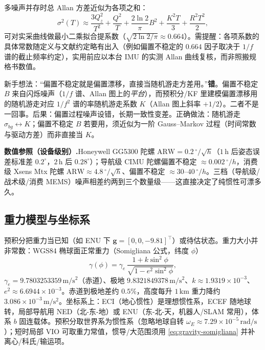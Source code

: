 多噪声并存时总 Allan 方差近似为各项之和：
\begin{equation}
  \sigma^2(T)\approx\frac{3Q_z^2}{T^2}+\frac{Q^2}{T}+\frac{2\ln2}{\pi}B^2+\frac{K^2T}{3}+\frac{R^2T^2}{2},
  \label{eq:allan-combined}
\end{equation}
可对实采曲线做最小二乘拟合提系数（$\sqrt{2\ln2/\pi}\approx0.664$）。需提醒：各项系数的具体常数随定义与文献约定略有出入（例如偏置不稳定的 $0.664$ 因子取决于 $1/f$ 谱的截止频率约定），实用前应以本台 IMU 的实测 Allan 曲线复核，而非照搬规格书数值。

\begin{pitfall}
新手想法：“偏置不稳定就是偏置漂移，直接当随机游走方差用。”\textbf{错}。偏置不稳定 $B$ 来自闪烁噪声（$1/f$ 谱、Allan 图上的\emph{平台}），而预积分/KF 里建模偏置漂移用的随机游走对应 $1/f^2$ 谱的率随机游走系数 $K$（Allan 图上斜率 $+1/2$）。二者不是一回事。后果：偏置过程噪声设错，长期一致性变差。正确做法：随机游走 $\sigma_{bg}\leftrightarrow K$；偏置不稳定 $B$ 若要用，须近似为一阶 Gauss--Markov 过程（时间常数与驱动方差）而非直接当 $K$。
\end{pitfall}

\begin{note}
\textbf{数值参照（设备级别）.}\;Honeywell GG5300 陀螺 $\mathrm{ARW}=0.2\,^\circ/\sqrt h$（$1\,\mathrm h$ 后姿态误差标准差 $0.2^\circ$，$2\,\mathrm h$ 后 $0.28^\circ$）\cite{woodman2007inertial}；导航级 CIMU 陀螺偏置不稳定 $\approx0.002\,^\circ/h$，消费级 Xsens Mtx 陀螺 $\mathrm{ARW}\approx4.8\,^\circ/\sqrt h$、偏置不稳定 $\approx30$--$40\,^\circ/h$。三档（导航级/战术级/消费 MEMS）噪声相差约两到三个数量级——这直接决定了纯惯性可漂多久。
\end{note}

\subsection{重力模型与坐标系}
\label{subsec:gravity}

预积分把重力当已知（如 ENU 下 $\mathbf g=[0,0,-9.81]^\top$）或待估状态。重力大小并非常数：WGS84 椭球面正常重力（Somigliana 公式，纬度 $\phi$）
\begin{equation}
  \gamma(\phi)=\gamma_e\,\frac{1+k\sin^2\phi}{\sqrt{1-e^2\sin^2\phi}},
  \label{eq:gravity-somigliana}
\end{equation}
$\gamma_e=9.7803253359\,\mathrm{m/s^2}$（赤道）、极地 $9.8321849378\,\mathrm{m/s^2}$、$k\approx1.9319\times10^{-3}$、$e^2\approx6.6944\times10^{-3}$。赤道到极地差约 $0.5\%$，高度每升 $1\,\mathrm{km}$ 重力降约 $3.086\times10^{-3}\,\mathrm{m/s^2}$。坐标系上：ECI（地心惯性）是理想惯性系，ECEF 随地球转，局部导航用 NED（北-东-地）或 ENU（东-北-天，机器人/SLAM 常用），体系 $b$ 固连载体。预积分取世界系为惯性系（忽略地球自转 $\omega_E\approx7.29\times10^{-5}\,\mathrm{rad/s}$）；短时局部 VIO 可取重力常值，惯导/大范围须用 \cref{eq:gravity-somigliana} 并补离心/科氏/输运项。

